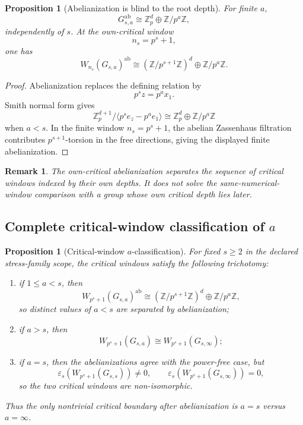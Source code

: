 \documentclass[11pt]{article}
\newtheorem{proposition}[theorem]{Proposition}
\newtheorem{remark}[theorem]{Remark}
\newcommand{\Zp}{\mathbb Z_p}
\newcommand{\W}{W}
\newcommand{\ab}{\mathrm{ab}}
\begin{document}
\begin{proposition}[Abelianization is blind to the root depth]
For finite \(a\),
\[
G_{s,a}^{\ab}
\cong
\mathbb Z_p^d\oplus\mathbb Z/p^a\mathbb Z,
\]
independently of \(s\).
At the own-critical window
\[
n_s=p^s+1,
\]
one has
\[
\boxed{
\W_{n_s}(G_{s,a})^{\ab}
\cong
(\mathbb Z/p^{s+1}\mathbb Z)^d\oplus\mathbb Z/p^a\mathbb Z.
}
\]
\end{proposition}

\begin{proof}
Abelianization replaces the defining relation by
\[
p^s z=p^a x_1.
\]
Smith normal form gives
\[
\Zp^{d+1}/\langle p^s e_z-p^a e_1\rangle
\cong
\mathbb Z_p^d\oplus\mathbb Z/p^a\mathbb Z
\]
when \(a<s\).  In the finite window \(n_s=p^s+1\), the abelian
Zassenhaus filtration contributes \(p^{s+1}\)-torsion in the free
directions, giving the displayed finite abelianization.
\end{proof}

\begin{remark}
The own-critical abelianization separates the sequence of critical
windows indexed by their \emph{own} depths.  It does not solve the
same-numerical-window comparison with a group whose own critical depth
lies later.
\end{remark}

\subsection{Complete critical-window classification of $a$}
\begin{proposition}[Critical-window $a$-classification]
For fixed $s\ge2$ in the declared stress-family scope, the critical
windows satisfy the following trichotomy:
\begin{enumerate}
\item if $1\le a<s$, then
\[
\W_{p^s+1}(G_{s,a})^{\ab}
\cong
(\mathbb Z/p^{s+1}\mathbb Z)^d\oplus\mathbb Z/p^a\mathbb Z,
\]
so distinct values of $a<s$ are separated by abelianization;
\item if $a>s$, then
\[
\W_{p^s+1}(G_{s,a})\cong
\W_{p^s+1}(G_{s,\infty});
\]
\item if $a=s$, then the abelianizations agree with the power-free
case, but
\[
\varepsilon_s(\W_{p^s+1}(G_{s,s}))\ne0,
\qquad
\varepsilon_s(\W_{p^s+1}(G_{s,\infty}))=0,
\]
so the two critical windows are non-isomorphic.
\end{enumerate}
Thus the only nontrivial critical boundary after abelianization is
$a=s$ versus $a=\infty$.
\end{proposition}
\end{document}

